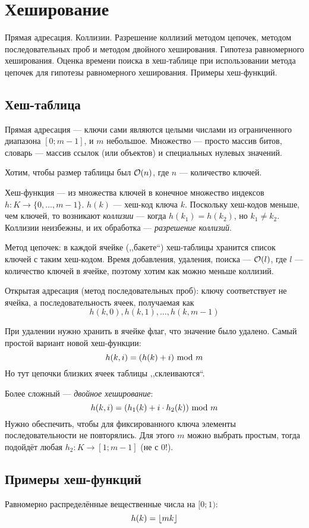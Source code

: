 \section{Хеширование}
Прямая адресация.
Коллизии.
Разрешение коллизий методом цепочек,
методом последовательных проб и методом двойного хеширования.
Гипотеза равномерного хеширования.
Оценка времени поиска в хеш-таблице при
использовании метода цепочек для гипотезы
равномерного хеширования.
Примеры хеш-функций.

\subsection{Хеш-таблица}
Прямая адресация --- ключи сами являются целыми числами
из ограниченного диапазона $[0; m - 1]$, и $m$ небольшое.
Множество --- просто массив битов,
словарь --- массив ссылок (или объектов)
и специальных нулевых значений.

Хотим, чтобы размер таблицы был $\mathcal{O}(n)$,
где $n$ --- количество ключей.

Хеш-функция --- из множества ключей в
конечное множество индексов $h: K \to \{0, \ldots, m - 1\}$.
$h(k)$ --- хеш-код ключа $k$.
Поскольку хеш-кодов меньше, чем ключей,
то возникают \emph{коллизии}
--- когда $h(k_1) = h(k_2)$, но $k_1 \ne k_2$.
Коллизии неизбежны, и их обработка --- \emph{разрешение коллизий}.

\bigskip

Метод цепочек: в каждой ячейке (,,бакете``) хеш-таблицы
хранится список ключей с таким хеш-кодом.
Время добавления, удаления, поиска --- $\mathcal{O}(l)$,
где $l$ --- количество ключей в ячейке,
поэтому хотим как можно меньше коллизий.

\bigskip

Открытая адресация (метод последовательных проб):
ключу соответствует не ячейка,
а последовательность ячеек, получаемая как
\[ h(k, 0), h(k, 1), \ldots, h(k, m - 1) \]

При удалении нужно хранить в ячейке флаг, что значение было удалено.
Самый простой вариант новой хеш-функции:
\[ h(k, i) = (h(k) + i) ~\text{mod}~ m \]
Но тут цепочки близких ячеек таблицы ,,склеиваются``.

Более сложный --- \emph{двойное хеширование}:
\[ h(k, i) = (h_1(k) + i \cdot h_2(k)) ~\text{mod}~ m \]
Нужно обеспечить, чтобы для фиксированного ключа элементы
последовательности не повторялись.
Для этого $m$ можно выбрать простым,
тогда подойдёт любая $h_2 : K \to [1; m - 1]$ (не с 0!).

\subsection{Примеры хеш-функций}
Равномерно распределённые вещественные числа на $[0; 1)$:
\[ h(k) = \left \lfloor mk \right \rfloor \]

